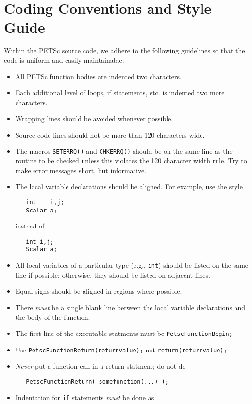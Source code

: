 \section{Coding Conventions and Style Guide}

Within the PETSc source code, we adhere to the following guidelines
so that the code is uniform and easily maintainable:

\begin{itemize}
\item All PETSc function bodies are indented two characters.
\item Each additional level of loops, if statements, etc. is indented
      two more characters.
\item Wrapping lines should be avoided whenever possible.
\item Source code lines should not be more than 120 characters wide.
\item The macros {\tt SETERRQ()} and {\tt CHKERRQ()} should be on the 
      same line as the routine to be checked unless this violates the 
      120 character width rule. Try to make error messages short, but 
      informative.
\item The local variable declarations should be aligned. For example,
      use the style
\begin{verbatim}
   int    i,j;
   Scalar a;
\end{verbatim}
instead of
\begin{verbatim}
   int i,j;
   Scalar a;
\end{verbatim}
\item All local variables of a particular type (e.g., {\tt int}) should be 
      listed on the same line if possible; otherwise, they should be listed
      on adjacent lines.
\item Equal signs should be aligned in regions where possible.
\item There {\em must} be a single blank line
      between the local variable declarations and the body of the function.
\item The first line of the executable statments must be {\tt PetscFunctionBegin;}
\item Use {\tt PetscFunctionReturn(returnvalue);} not {\tt return(returnvalue);}
\item {\em Never} put a function call in a return statment; do not do
\begin{verbatim}
   PetscFunctionReturn( somefunction(...) );
\end{verbatim}
\item Indentation for {\tt if} statements {\em must}  be done  as

\end{itemize}
